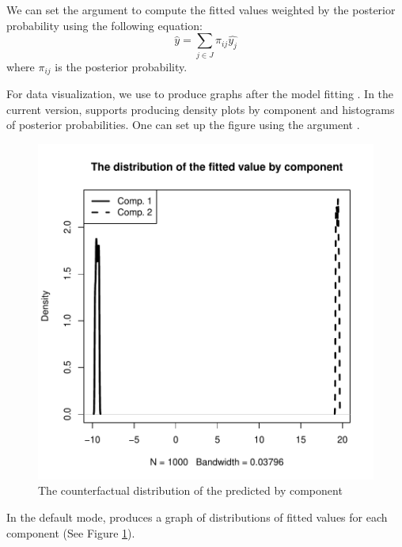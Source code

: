 \documentclass[nojss]{jss}
\begin{document}
We can set the argument  to compute the fitted values weighted by the posterior probability using the following equation:
\begin{equation}
\hat{y} = \sum_{j \in J} \pi_{ij} \hat{y_j} 
\end{equation}
where $\pi_{ij}$ is the posterior probability. 

For data visualization, we use  to produce graphs after the model fitting . In the current version,  supports producing density plots by component and histograms of posterior probabilities. One can set up the figure using the argument . 

\begin{figure}[htp]
\caption{The counterfactual distribution of the predicted by component}
\label{fig:plot1}
\centering
\includegraphics{em_intro-004}
\end{figure}
In the default mode,  produces a graph of distributions of fitted values for each component (See Figure \ref{fig:plot1}). 
\end{document}
